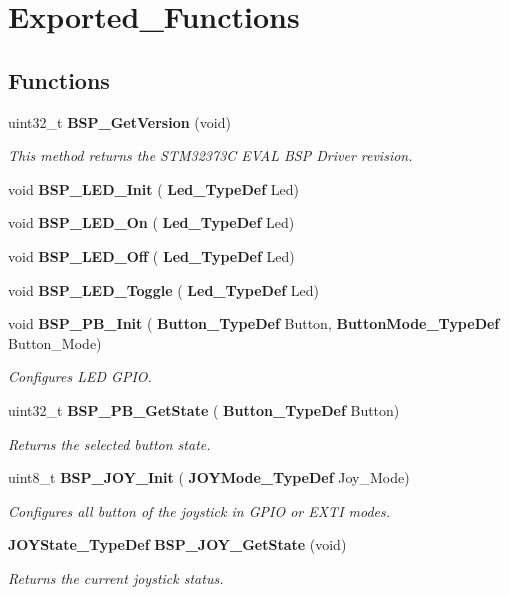 \section{Exported\+\_\+\+Functions}
\label{group___exported___functions}
\subsection*{Functions}
\begin{DoxyCompactItemize}
\item 
uint32\+\_\+t \textbf{ B\+S\+P\+\_\+\+Get\+Version} (void)
\begin{DoxyCompactList}\small\item\em This method returns the S\+T\+M32373C E\+V\+AL B\+SP Driver revision. \end{DoxyCompactList}\item 
void \textbf{ B\+S\+P\+\_\+\+L\+E\+D\+\_\+\+Init} (\textbf{ Led\+\_\+\+Type\+Def} Led)
\item 
void \textbf{ B\+S\+P\+\_\+\+L\+E\+D\+\_\+\+On} (\textbf{ Led\+\_\+\+Type\+Def} Led)
\item 
void \textbf{ B\+S\+P\+\_\+\+L\+E\+D\+\_\+\+Off} (\textbf{ Led\+\_\+\+Type\+Def} Led)
\item 
void \textbf{ B\+S\+P\+\_\+\+L\+E\+D\+\_\+\+Toggle} (\textbf{ Led\+\_\+\+Type\+Def} Led)
\item 
void \textbf{ B\+S\+P\+\_\+\+P\+B\+\_\+\+Init} (\textbf{ Button\+\_\+\+Type\+Def} Button, \textbf{ Button\+Mode\+\_\+\+Type\+Def} Button\+\_\+\+Mode)
\begin{DoxyCompactList}\small\item\em Configures L\+ED G\+P\+IO. \end{DoxyCompactList}\item 
uint32\+\_\+t \textbf{ B\+S\+P\+\_\+\+P\+B\+\_\+\+Get\+State} (\textbf{ Button\+\_\+\+Type\+Def} Button)
\begin{DoxyCompactList}\small\item\em Returns the selected button state. \end{DoxyCompactList}\item 
uint8\+\_\+t \textbf{ B\+S\+P\+\_\+\+J\+O\+Y\+\_\+\+Init} (\textbf{ J\+O\+Y\+Mode\+\_\+\+Type\+Def} Joy\+\_\+\+Mode)
\begin{DoxyCompactList}\small\item\em Configures all button of the joystick in G\+P\+IO or E\+X\+TI modes. \end{DoxyCompactList}\item 
\textbf{ J\+O\+Y\+State\+\_\+\+Type\+Def} \textbf{ B\+S\+P\+\_\+\+J\+O\+Y\+\_\+\+Get\+State} (void)
\begin{DoxyCompactList}\small\item\em Returns the current joystick status. \end{DoxyCompactList}\end{DoxyCompactItemize}


